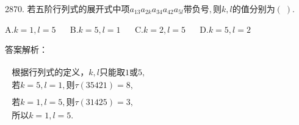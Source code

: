 2870. $\mathrm{若五阶行列式的展开式中项}a_{13}a_{2k}a_{34}a_{42}a_{5l}\mathrm{带负号},\mathrm 则k,l\mathrm{的值分别为}(\;).$

A.$k=1,l=5$ $\quad$ B.$k=5,l=1$ $\quad$ C.$k=2,l=5$ $\quad$ D.$k=5,l=2$

答案解析：

$\begin{array}{l}\begin{array}{l}\mathrm{根据行列式的定义}，k,l\mathrm{只能取}1或5,\\若k=5,l=1,则\tau(35421)=8,\end{array}\\\begin{array}{l}若k=1,l=5,则\tau(31425)=3,\\\mathrm{所以}k=1,l=5.\\\end{array}\end{array}$


